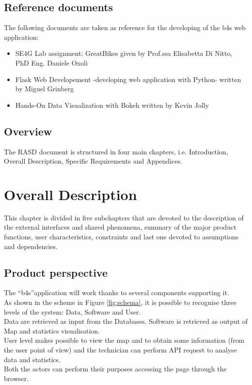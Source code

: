 \documentclass{article}
\begin{document}
\subsection{Reference documents}
The following documents are taken as reference for the developing of the b4s web application:
\begin{itemize}
    \item SE4G Lab assignment: GreatBikes given by Prof.ssa Elisabetta Di Nitto, PhD Eng. Daniele Oxoli
    \item Flask Web Developement -developing web application with Python- written by Miguel Grinberg
    \item Hands-On Data Visualization with Bokeh written by Kevin Jolly 
\end{itemize}


\subsection{Overview}
The RASD document is structured in four main chapters, i.e. Introduction, Overall Description, Specific Requirements and Appendices. 

\section{Overall Description}
This chapter is divided in five subchapters that are devoted to the description of the external interfaces and shared phenomena, summary of the major product functions, user characteristics, constraints and last one devoted to assumptions and dependencies.
\subsection{Product perspective}
The “b4s”application will work thanks to several components supporting it.\\ As shown in the scheme in Figure \ref{fig:schema}, it is possible to recognise three levels of the system: Data, Software and User.\\ 
Data are retrieved as input from the Databases.
Software is retrieved as output of Map and statistics visualisation.\\
User level makes possible to view the map and to obtain some information (from the user point of view) and the technician can perform API request to analyse data and statistics.\\ Both the actors can perform their purposes accessing the page through the browser.\\
\end{document}
